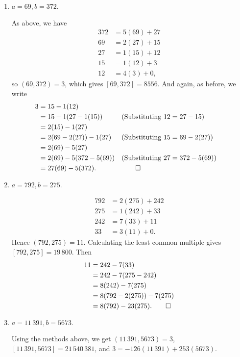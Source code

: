 \begin{enumerate}
\item
  $a = 69, b = 372$.
  \begin{solution}
    As above, we have
    \begin{align*}
      372 &= 5(69) + 27 \\
      69 &= 2(27) + 15 \\
      27 &= 1(15) + 12 \\
      15 &= 1(12) + 3 \\
      12 &= 4(3) + 0,
    \end{align*}
    so $(69, 372) = 3$, which gives $[69, 372] = 8556$. And again, as
    before, we write
    \begin{align*}
      3 &= 15 - 1(12) \\
        &= 15 - 1(27 - 1(15)) && \text{(Substituting $12 = 27 - 15$)} \\
        &= 2(15) - 1(27) \\
        &= 2(69 - 2(27)) - 1(27) && \text{(Substituting $15 = 69 - 2(27)$)} \\
        &= 2(69) - 5(27) \\
        &= 2(69) - 5(372 - 5(69)) && \text{(Substituting $27 = 372 - 5(69)$)} \\
        &= 27(69) - 5(372). && \qedhere
    \end{align*}
  \end{solution}

\item
  $a = 792, b = 275$.
  \begin{solution}
    \begin{align*}
      792 &= 2(275) + 242 \\
      275 &= 1(242) + 33 \\
      242 &= 7(33) + 11 \\
      33 &= 3(11) + 0.
    \end{align*}
    Hence $(792, 275) = 11$. Calculating the least common multiple
    gives $[792, 275] = 19\,800$. Then
    \begin{align*}
      11 &= 242 - 7(33) \\
         &= 242 - 7(275 - 242) \\
         &= 8(242) - 7(275) \\
         &= 8(792 - 2(275)) - 7(275) \\
         &= 8(792) - 23(275). \qedhere
    \end{align*}
  \end{solution}

\item
  $a = 11\,391, b = 5673$.
  \begin{solution}
    Using the methods above, we get $(11\,391, 5673) = 3$,
    $[11\,391, 5673] = 21\,540\,381$, and
    $3 = -126(11\,391) + 253(5673)$.
  \end{solution}


\end{enumerate}
